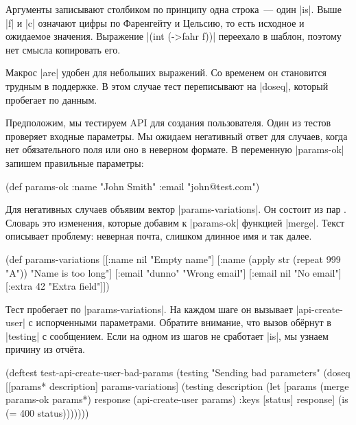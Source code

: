 Аргументы записывают столбиком по принципу одна строка~--- один
\spverb|is|. Выше \spverb|f| и \spverb|c| означают цифры по Фаренгейту и
Цельсию, то есть исходное и ожидаемое значения. Выражение \spverb|(int (->fahr f))|
переехало в шаблон, поэтому нет смысла копировать его.

Макрос \spverb|are| удобен для небольших выражений. Со временем он становится
трудным в поддержке. В этом случае тест переписывают на \spverb|doseq|, который
пробегает по данным.

Предположим, мы тестируем API для создания пользователя. Один из тестов
проверяет входные параметры. Мы ожидаем негативный ответ для случаев, когда нет
обязательного поля или оно в неверном формате. В переменную \spverb|params-ok|
запишем правильные параметры:

\begin{english}
  \begin{clojure}
(def params-ok {:name "John Smith" :email "john@test.com"})
  \end{clojure}
\end{english}

Для негативных случаев объявим вектор \spverb|params-variations|. Он состоит из
пар . Словарь это изменения, которые добавим к
\spverb|params-ok| функцией \spverb|merge|. Текст описывает проблему: неверная
почта, слишком длинное имя и так далее.

\begin{english}
  \begin{clojure}
(def params-variations
  [[{:name nil} "Empty name"]
   [{:name (apply str (repeat 999 "A"))} "Name is too long"]
   [{:email "dunno"} "Wrong email"]
   [{:email nil} "No email"]
   [{:extra 42} "Extra field"]])
  \end{clojure}
\end{english}

Тест пробегает по \spverb|params-variations|. На каждом шаге он вызывает
\spverb|api-create-user| с испорченными параметрами. Обратите внимание, что
вызов обёрнут в \spverb|testing| с сообщением. Если на одном из шагов не
сработает \spverb|is|, мы узнаем причину из отчёта.

\begin{english}
  \begin{clojure}
(deftest test-api-create-user-bad-params
  (testing "Sending bad parameters"
    (doseq [[params* description] params-variations]
      (testing description
        (let [params (merge params-ok params*)
              response (api-create-user params)
              {:keys [status]} response]
          (is (= 400 status)))))))
  \end{clojure}
\end{english}

